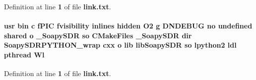 Definition at line {\bf 1} of file {\bf link.\+txt}.

\paragraph[{Wl}]{\setlength{\rightskip}{0pt plus 5cm}usr bin {\bf c} f\+P\+IC fvisibility inlines hidden O2 g D\+N\+D\+E\+B\+UG no undefined shared o \+\_\+\+Soapy\+S\+DR {\bf so} C\+Make\+Files \+\_\+\+Soapy\+S\+DR dir Soapy\+S\+D\+R\+P\+Y\+T\+H\+O\+N\+\_\+wrap cxx o lib lib\+Soapy\+S\+DR {\bf so} lpython2 ldl {\bf pthread} Wl}\label{soapysdr_2build_2python_2CMakeFiles_2__SoapySDR_8dir_2link_8txt_a0bf3e1a4901076fd568eb25cac7375bc}


Definition at line {\bf 1} of file {\bf link.\+txt}.

